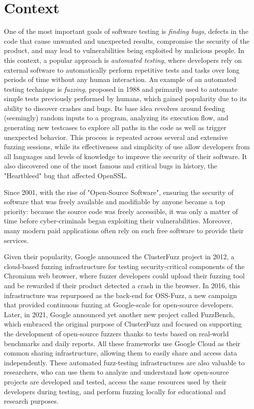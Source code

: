 \section{Context}
One of the most important goals of software testing is \textit{finding bugs}, defects in the code that cause unwanted and unexpected results, compromise the security of the product, and may lead to vulnerabilities being exploited by malicious people. In this context, a popular approach is \textit{automated testing}, where developers rely on external software to automatically perform repetitive tests and tasks over long periods of time without any human interaction. An example of an automated testing technique is \textit{fuzzing}, proposed in 1988 \cite{fuzz_proposed} and primarily used to automate simple tests previously performed by humans, which gained popularity due to its ability to discover crashes and bugs. Its base idea revolves around feeding (seemingly) random inputs to a program, analyzing its execution flow, and generating new testcases to explore all paths in the code as well as trigger unexpected behavior. This process is repeated across several and extensive fuzzing sessions, while its effectiveness and simplicity of use allow developers from all languages and levels of knowledge to improve the security of their software. It also discovered one of the most famous and critical bugs in history, the "Heartbleed" bug that affected OpenSSL.

Since 2001, with the rise of "Open-Source Software", ensuring the security of software that was freely available and modifiable by anyone became a top priority: because the source code was freely accessible, it was only a matter of time before cyber-criminals began exploiting their vulnerabilities. Moreover, many modern paid applications often rely on such free software to provide their services. 

Given their popularity, Google announced the ClusterFuzz project in 2012, a cloud-based fuzzing infrastructure for testing security-critical components of the Chromium web browser, where fuzzer developers could upload their fuzzing tool and be rewarded if their product detected a crash in the browser. In 2016, this infrastructure was repurposed as the back-end for OSS-Fuzz, a new campaign that provided continuous fuzzing at Google-scale for open-source developers. Later, in 2021, Google announced yet another new project called FuzzBench, which embraced the original purpose of ClusterFuzz and focused on supporting the development of open-source fuzzers thanks to tests based on real-world benchmarks and daily reports. All these frameworks use Google Cloud as their common sharing infrastructure, allowing them to easily share and access data independently. These automated fuzz-testing infrastructures are also valuable to researchers, who can use them to analyze and understand how open-source projects are developed and tested, access the same resources used by their developers during testing, and perform fuzzing locally for educational and research purposes.

